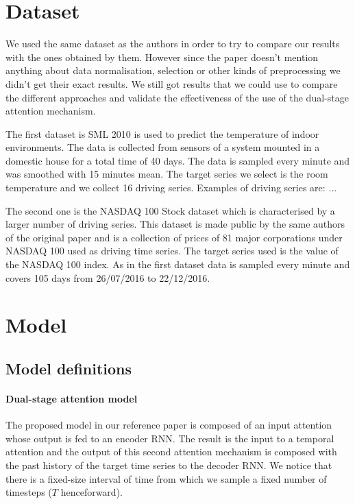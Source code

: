 \documentclass{article}
\begin{document}
\section{Dataset}
\label{sec:retrieval}

We used the same dataset as the authors in order to try to compare our results
with the ones obtained by them. However
since the paper doesn't mention anything about data normalisation, selection or
other kinds of preprocessing we didn't
get their exact results. We still got results that we could use to compare the
different approaches and validate the
effectiveness of the use of the dual-stage attention mechanism.

The first dataset is SML 2010 is used to predict the temperature of indoor 
environments. The data is collected from sensors of a system mounted in a 
domestic house for a total time of 40 days. The data is sampled every minute and 
was smoothed with 15 minutes mean. The target series we select is the room 
temperature and we collect 16 driving series. Examples of driving series are: ...

The second one is the NASDAQ 100 Stock dataset which is characterised by a
larger number of driving series. This dataset is made public by the same authors of the original paper and is a collection of prices of 81 major corporations under NASDAQ 100 used as driving time series. The target series used is the value of the NASDAQ 100 index. As in the first dataset data is sampled every minute and covers 105 days from 26/07/2016 to 22/12/2016.

\section{Model}
\label{sec:model}

\subsection{Model definitions}
\paragraph{Dual-stage attention model}

The proposed model in our reference paper is composed of an input attention
whose output is fed to an encoder RNN. The
result is the input to a temporal attention and the output of this second
attention mechanism is composed with the
past history of the target time series to the decoder RNN. We notice that there
is a fixed-size interval of time from
which we sample a fixed number of timesteps ($T$ henceforward).
\end{document}
